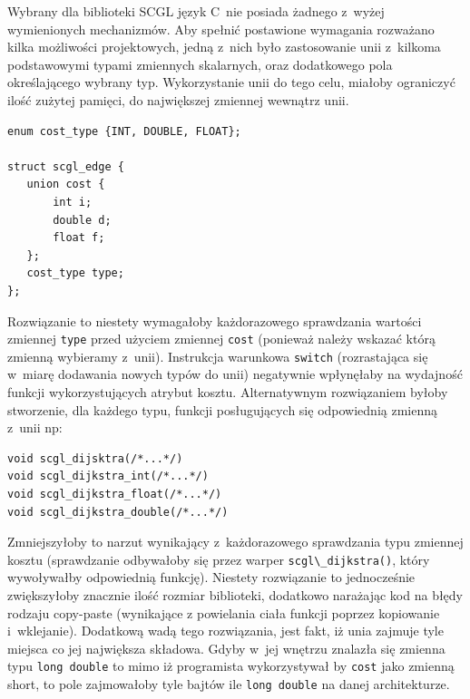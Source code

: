 \documentclass[a4paper,12pt,polish,oneside,openright]{thesis}
\newcommand\code[1]{\lstinline[style=line]{#1}}
\begin{document}
Wybrany dla biblioteki SCGL język C~nie posiada żadnego z~wyżej wymienionych mechanizmów.
Aby spełnić postawione wymagania rozważano kilka możliwości projektowych, jedną z~nich było zastosowanie unii z~kilkoma podstawowymi typami zmiennych skalarnych, oraz dodatkowego pola określającego wybrany typ.
Wykorzystanie unii do tego celu, miałoby ograniczyć ilość zużytej pamięci, do największej zmiennej wewnątrz unii.
\begin{lstlisting}[style=code,caption=Koszt krawędzi jako unia]
enum cost_type {INT, DOUBLE, FLOAT};

struct scgl_edge {
   union cost {
       int i;
       double d;
       float f;
   };
   cost_type type;
};
\end{lstlisting}
Rozwiązanie to niestety wymagałoby każdorazowego sprawdzania wartości zmiennej \code{type} przed użyciem zmiennej \code{cost} (ponieważ należy wskazać którą zmienną wybieramy z~unii).
Instrukcja warunkowa \code{switch} (rozrastająca się w~miarę dodawania nowych typów do unii) negatywnie wpłynęłaby na wydajność funkcji wykorzystujących atrybut kosztu.
Alternatywnym rozwiązaniem byłoby stworzenie, dla każdego typu, funkcji posługujących się odpowiednią zmienną z~unii np:
\begin{lstlisting}[style=coden]
void scgl_dijsktra(/*...*/)
void scgl_dijkstra_int(/*...*/)
void scgl_dijkstra_float(/*...*/)
void scgl_dijkstra_double(/*...*/)
\end{lstlisting}
Zmniejszyłoby to narzut wynikający z~każdorazowego sprawdzania typu zmiennej kosztu (sprawdzanie odbywałoby się przez warper \code{scgl\_dijkstra()}, który wywoływałby odpowiednią funkcję).
Niestety rozwiązanie to jednocześnie zwiększyłoby znacznie ilość rozmiar biblioteki, dodatkowo narażając kod na błędy rodzaju copy-paste (wynikające z powielania ciała funkcji poprzez kopiowanie i~wklejanie).
Dodatkową wadą tego rozwiązania, jest fakt, iż unia zajmuje tyle miejsca co jej największa składowa. Gdyby w~jej wnętrzu znalazła się zmienna typu \code{long double} to mimo iż programista wykorzystywał by \code{cost} jako zmienną short, to pole zajmowałoby tyle bajtów ile \code{long double} na danej architekturze.
\end{document}
